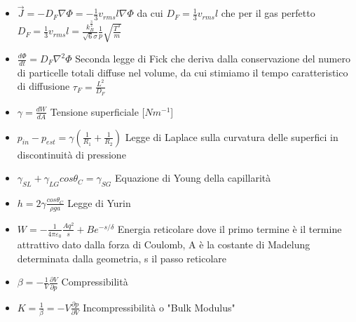 \documentclass[a4paper]{article}
\begin{document}
\begin{itemize}
	\item $\overrightarrow{J} = -D_F \nabla \Phi = - \frac{1}{3}v_{rms}l \nabla \Phi$ da cui $D_F = \frac{1}{3}v_{rms}l$ che per il gas perfetto $D_F = \frac{1}{3}v_{rms}l = \frac{k_B^\frac{3}{2}}{\sqrt{6} \sigma} \frac{1}{p} \sqrt{\frac{T^3}{m}}$
	\item $\frac{d\Phi}{dt}=D_F \nabla^2 \Phi$ Seconda legge di Fick che deriva dalla conservazione del numero di particelle totali diffuse nel volume, da cui stimiamo il tempo caratteristico di diffusione $\tau_F = \frac{L^2}{D_F} $	
	\item $\gamma = \frac{dW}{dA}$ Tensione superficiale [$Nm^{-1}$]
	\item $p_{in}-p_{est} = \gamma (\frac{1}{R_1}+\frac{1}{R_2})$ Legge di Laplace sulla curvatura delle superfici in discontinuità di pressione
	\item $\gamma_{SL}+\gamma_{LG}cos\theta_C=\gamma_{SG}$ Equazione di Young della capillarità
	\item $h = 2\gamma \frac{cos\theta_C}{\rho g a}$ Legge di Yurin
	\item $W = -\frac{1}{4\pi\varepsilon_0}\frac{Aq^2}{s}+Be^{-s/\delta}$ Energia reticolare dove il primo termine è il termine attrattivo dato dalla forza di Coulomb, A è la costante di Madelung determinata dalla geometria, s il passo reticolare	
	\item $\beta = -\frac{1}{V}\frac{\partial V}{\partial p}$ Compressibilità
	\item $K=\frac{1}{\beta}=-V \frac{\partial p}{\partial V}$ Incompressibilità o "Bulk Modulus"
	

\end{itemize}
\end{document}

